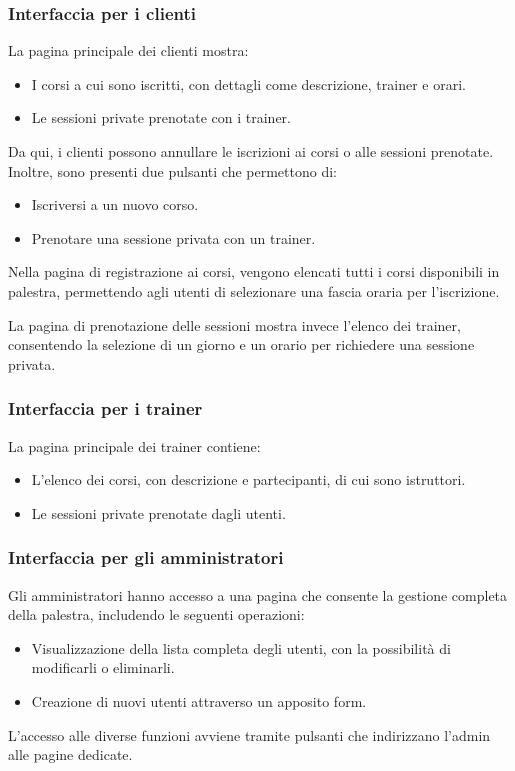 \documentclass{report}
\begin{document}
\subsubsection{Interfaccia per i clienti}
\par La pagina principale dei clienti mostra:
\begin{itemize}
    \item I corsi a cui sono iscritti, con dettagli come descrizione, trainer e orari.
    \item Le sessioni private prenotate con i trainer.
\end{itemize}
\par Da qui, i clienti possono annullare le iscrizioni ai corsi o alle sessioni prenotate. Inoltre, sono presenti due pulsanti che permettono di:
\begin{itemize}
    \item Iscriversi a un nuovo corso.
    \item Prenotare una sessione privata con un trainer.
\end{itemize}
\par Nella pagina di registrazione ai corsi, vengono elencati tutti i corsi disponibili in palestra, permettendo agli utenti di selezionare una fascia oraria per l'iscrizione.
\par La pagina di prenotazione delle sessioni mostra invece l'elenco dei trainer, consentendo la selezione di un giorno e un orario per richiedere una sessione privata.
\subsubsection{Interfaccia per i trainer}
\par La pagina principale dei trainer contiene:
\begin{itemize}
    \item L'elenco dei corsi, con descrizione e partecipanti, di cui sono istruttori.
    \item Le sessioni private prenotate dagli utenti.
\end{itemize}
\subsubsection{Interfaccia per gli amministratori}
\par Gli amministratori hanno accesso a una pagina che consente la gestione completa della palestra, includendo le seguenti operazioni:
\begin{itemize}
    \item Visualizzazione della lista completa degli utenti, con la possibilità di modificarli o eliminarli.
    \item Creazione di nuovi utenti attraverso un apposito form.
\end{itemize}
\par L'accesso alle diverse funzioni avviene tramite pulsanti che indirizzano l'admin alle pagine dedicate.
\end{document}
